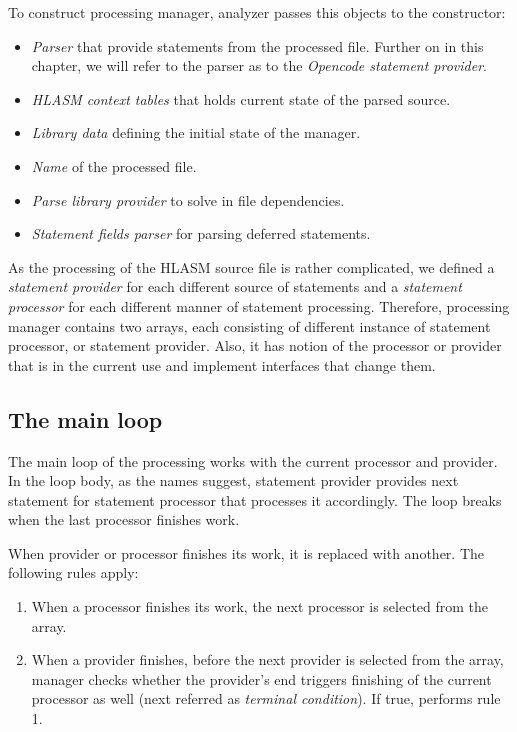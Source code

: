 To construct processing manager, analyzer passes this objects to the constructor:
\begin{itemize}
	\item \emph{Parser} that provide statements from the processed file. Further on in this chapter, we will refer to the parser as to the \emph{Opencode statement provider}.
	\item \emph{HLASM context tables} that holds current state of the parsed source.
	\item \emph{Library data} defining the initial state of the manager.
	\item \emph{Name} of the processed file.
	\item \emph{Parse library provider} to solve in file dependencies.
	\item \emph{Statement fields parser} for parsing deferred statements. 
\end{itemize}

As the processing of the HLASM source file is rather complicated, we defined a \emph{statement provider} for each different source of statements and a \emph{statement processor} for each different manner of statement processing. Therefore, processing manager contains two arrays, each consisting of different instance of statement processor, or statement provider.  Also, it has notion of the processor or provider that is in the current use and implement interfaces that change them.

\subsection{The main loop}

The main loop of the processing works with the current processor and provider. In the loop body, as the names suggest, statement provider provides next statement for statement processor that processes it accordingly. The loop breaks when the last processor finishes work.

When provider or processor finishes its work, it is replaced with another. The following rules apply:

\begin{enumerate}
	\item When a processor finishes its work, the next processor is selected from the array.
	\item When a provider finishes, before the next provider is selected from the array, manager checks whether the provider's end triggers finishing of the current processor as well (next referred as \emph{terminal condition}). If true, performs rule 1.
\end{enumerate}

